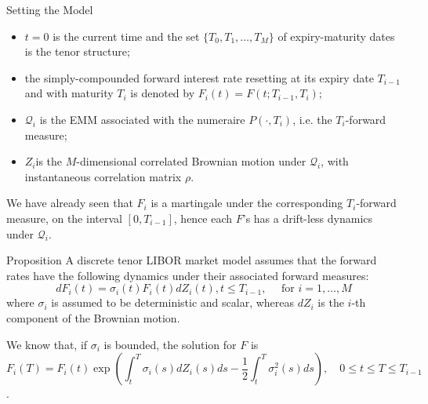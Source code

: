 \documentclass{beamer}
\begin{document}
\begin{frame}{Setting the Model}
\begin{itemize}
	\item $t = 0$ is the current time and the set $\{T_0, T_1, \dots, T_M\}$ of expiry-maturity dates is the tenor structure; %
	\item the simply-compounded forward interest rate resetting at its expiry date $T_{i-1}$ and with maturity $T_i$ is denoted by $F_i(t) = F(t; T_{i-1}, T_i)$; %
	\item $\mathcal{Q}_i$ is the EMM associated with the numeraire $P(\cdot, T_i)$, i.e. the $T_i$-forward measure;
	\item $Z_i$is the $M$-dimensional correlated Brownian motion under $\mathcal{Q}_i$, with instantaneous correlation matrix $\rho$.
\end{itemize}
We have already seen that $F_i$ is a martingale under the corresponding $T_i$-forward measure, on the interval $[0, T_{i-1}]$, hence each $F$’s has a drift-less dynamics under $\mathcal{Q}_i$.
\end{frame}

\begin{frame}
\begin{block}{Proposition}
A discrete tenor LIBOR market model assumes that the forward rates have the following dynamics under their associated forward measures:
\begin{equation*}
dF_i(t) = \sigma_i(t)F_i(t)dZ_i(t), t \le T_{i-1},\quad\text{ for } i = 1,\ldots, M
\label{eq:forward_process_lmm}
\end{equation*}
where $\sigma_i$ is assumed to be deterministic and scalar, whereas $dZ_i$ is the $i$-th component of the Brownian motion.
\end{block}

We know that, if $\sigma_i$ is bounded, the solution for $F$ is 
\begin{equation*}
F_i(T) = F_i(t) \exp\left(\int_t^T\sigma_i(s)dZ_i(s)ds - \frac{1}{2}\int_t^T 
\sigma_i^2(s)ds\right),\quad 0\le t \le T \le T_{i-1} 
\end{equation*}.
\end{frame}
\end{document}
